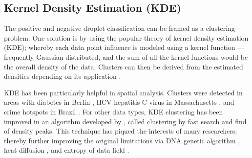\subsection{Kernel Density Estimation (KDE)}
\label{sec:peakdetectionkde}
The positive and negative droplet classification can be framed as a clustering problem. One solution is by using the popular theory of kernel density estimation (KDE); whereby each data point influence is modeled using a kernel function — frequently Gaussian distributed, and the sum of all the kernel functions would be the overall density of the data. Clusters can then be derived from the estimated densities depending on its application \cite{Hinneburg2003}.

KDE has been particularly helpful in spatial analysis. Clusters were detected in areas with diabetes in Berlin \cite{Kauhl2016}, HCV hepatitis C virus in Massachusetts \cite{Stopka2017}, and crime hotspots in Brazil \cite{Junior2019}. For other data types, KDE clustering has been improved in an algorithm developed by , called clustering by fast search and find of density peaks. This technique has piqued the interests of many researchers; thereby further improving the original limitations via DNA genetic algorithm \cite{Zang2017}, heat diffusion \cite{Mehmood2016}, and entropy of data field \cite{Wang2016}.  

